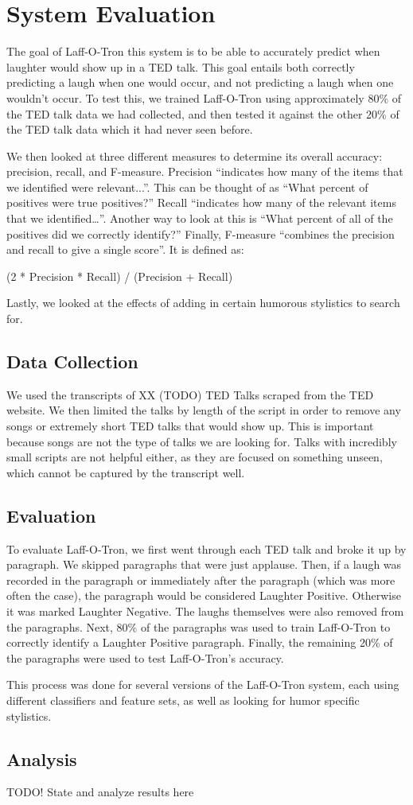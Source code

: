 \chapter{System Evaluation}

The goal of Laff-O-Tron this system is to be able to accurately predict when laughter would show up in a TED talk. This goal entails both correctly predicting a laugh when one would occur, and not predicting a laugh when one wouldn't occur. To test this, we trained Laff-O-Tron using approximately 80\% of the TED talk data we had collected, and then tested it against the other 20\% of the TED talk data which it had never seen before. 

We then looked at three different measures to determine its overall accuracy: precision, recall, and F-measure. Precision ``indicates how many of the items that we identified were relevant...''\cite{NLTK}. This can be thought of as ``What percent of positives were true positives?'' Recall ``indicates how many of the relevant items that we identified…''\cite{NLTK}. Another way to look at this is ``What percent of all of the positives did we correctly identify?'' Finally, F-measure ``combines the precision and recall to give a single score''\cite{NLTK}. It is defined as:

	(2 * Precision * Recall) / (Precision + Recall)

Lastly, we looked at the effects of adding in certain humorous stylistics to search for. 

\section{Data Collection}
We used the transcripts of XX (TODO) TED Talks scraped from the TED website. We then limited the talks by length of the script in order to remove any songs or extremely short TED talks that would show up. This is important because songs are not the type of talks we are looking for. Talks with incredibly small scripts are not helpful either, as they are focused on something unseen, which cannot be captured by the transcript well.

\section{Evaluation}
To evaluate Laff-O-Tron, we first went through each TED talk and broke it up by paragraph. We skipped paragraphs that were just applause. Then, if a laugh was recorded in the paragraph or immediately after the paragraph (which was more often the case), the paragraph would be considered Laughter Positive. Otherwise it was marked Laughter Negative. The laughs themselves were also removed from the paragraphs. Next, 80\% of the paragraphs was used to train Laff-O-Tron to correctly identify a Laughter Positive paragraph. Finally, the remaining 20\% of the paragraphs were used to test Laff-O-Tron’s accuracy.  

This process was done for several versions of the Laff-O-Tron system, each using different classifiers and feature sets, as well as looking for humor specific stylistics.


\section{Analysis}
TODO! State and analyze results here

